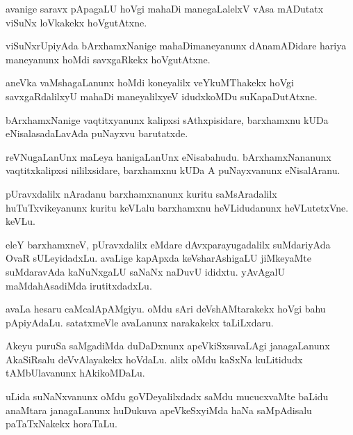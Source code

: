 \begin{mng}
avanige saravx pApagaLU hoVgi mahaDi manegaLalelxV vAsa mADutatx viSuNx loVkakekx hoVgutAtxne.
\end{mng}

\begin{mng}
viSuNxrUpiyAda bArxhamxNanige mahaDimaneyanunx dAnamADidare hariya maneyanunx  hoMdi savxgaRkekx hoVgutAtxne.
\end{mng}

\begin{mng}
aneVka vaMshagaLanunx hoMdi koneyalilx veYkuMThakekx hoVgi savxgaRdalilxyU mahaDi maneyalilxyeV idudxkoMDu suKapaDutAtxne.
\end{mng}

\begin{mng}
bArxhamxNanige vaqtitxyanunx kalipxsi sAthxpisidare, barxhamxnu kUDa eNisalasadaLavAda puNayxvu barutatxde.
\end{mng}

\begin{mng}
reVNugaLanUnx maLeya hanigaLanUnx eNisabahudu. bArxhamxNananunx vaqtitxkalipxsi nililxsidare, barxhamxnu kUDa A puNayxvanunx eNisalAranu.
\end{mng}

\begin{mng}
pUravxdalilx nAradanu barxhamxnanunx kuritu saMsAradalilx huTuTxvikeyanunx kuritu keVLalu barxhamxnu heVLidudanunx heVLutetxVne. keVLu.
\end{mng}

\begin{mng}
eleY barxhamxneV, pUravxdalilx eMdare dAvxparayugadalilx suMdariyAda OvaR sULeyidadxLu. avaLige kapApxda keVsharAshigaLU jiMkeyaMte suMdaravAda kaNuNxgaLU saNaNx naDuvU ididxtu. yAvAgalU maMdahAsadiMda irutitxdadxLu.
\end{mng}

\begin{mng}
avaLa hesaru caMcalApAMgiyu. oMdu sAri deVshAMtarakekx hoVgi bahu pApiyAdaLu. satatxmeVle avaLanunx narakakekx taLiLxdaru.
\end{mng}

\begin{mng}
Akeyu puruSa saMgadiMda duDaDxnunx apeVkiSxsuvaLAgi janagaLanunx AkaSiRsalu deVvAlayakekx hoVdaLu. alilx oMdu kaSxNa kuLitidudx tAMbUlavanunx hAkikoMDaLu.
\end{mng}

\begin{mng}
uLida suNaNxvanunx oMdu goVDeyalilxdadx saMdu mucucxvaMte baLidu anaMtara janagaLanunx huDukuva apeVkeSxyiMda haNa saMpAdisalu paTaTxNakekx horaTaLu.
\end{mng}

